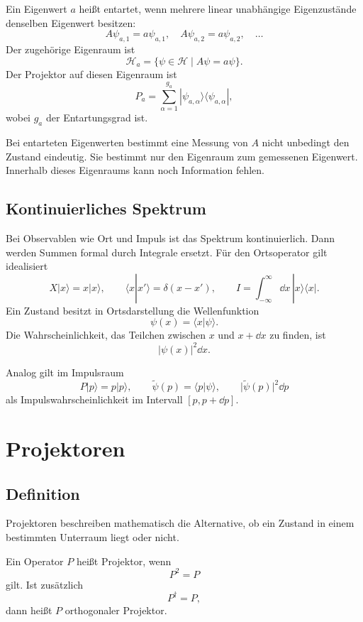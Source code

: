 Ein Eigenwert $a$ heißt entartet, wenn mehrere linear unabhängige Eigenzustände denselben Eigenwert besitzen:
\[
    A\psi_{a,1}=a\psi_{a,1},
    \quad
    A\psi_{a,2}=a\psi_{a,2},
    \quad \dots
\]
Der zugehörige Eigenraum ist
\[
    \mathcal H_a=\{\psi\in\mathcal H\mid A\psi=a\psi\}.
\]
Der Projektor auf diesen Eigenraum ist
\[
    P_a=\sum_{\alpha=1}^{g_a}|\psi_{a,\alpha}\rangle\langle\psi_{a,\alpha}|,
\]
wobei $g_a$ der Entartungsgrad ist.

\begin{notebox}
Bei entarteten Eigenwerten bestimmt eine Messung von $A$ nicht unbedingt den Zustand eindeutig. Sie bestimmt nur den Eigenraum zum gemessenen Eigenwert. Innerhalb dieses Eigenraums kann noch Information fehlen.
\end{notebox}

\subsection{Kontinuierliches Spektrum}

Bei Observablen wie Ort und Impuls ist das Spektrum kontinuierlich. Dann werden Summen formal durch Integrale ersetzt. Für den Ortsoperator gilt idealisiert
\[
    X|x\rangle=x|x\rangle,
    \qquad
    \langle x|x'\rangle=\delta(x-x'),
    \qquad
    I=\int_{-\infty}^{\infty}\dd x\,|x\rangle\langle x|.
\]
Ein Zustand besitzt in Ortsdarstellung die Wellenfunktion
\[
    \psi(x)=\langle x|\psi\rangle.
\]
Die Wahrscheinlichkeit, das Teilchen zwischen $x$ und $x+\dd x$ zu finden, ist
\[
    |\psi(x)|^2\dd x.
\]

Analog gilt im Impulsraum
\[
    P|p\rangle=p|p\rangle,
    \qquad
    \tilde\psi(p)=\langle p|\psi\rangle,
    \qquad
    |\tilde\psi(p)|^2\dd p
\]
als Impulswahrscheinlichkeit im Intervall $[p,p+\dd p]$.

\section{Projektoren}

\subsection{Definition}

Projektoren beschreiben mathematisch die Alternative, ob ein Zustand in einem bestimmten Unterraum liegt oder nicht.

\begin{definitionbox}
Ein Operator $P$ heißt Projektor, wenn
\[
    P^2=P
\]
gilt. Ist zusätzlich
\[
    P^\dagger=P,
\]
dann heißt $P$ orthogonaler Projektor.
\end{definitionbox}

